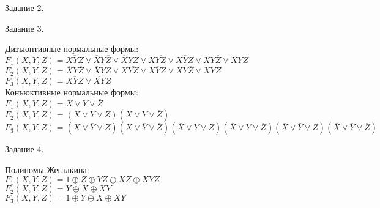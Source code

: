 \documentclass[a4paper,12pt]{report} %
\begin{document}
\bigskip

\newpage
\begin{center}
Задание  2.\\
\end{center}

\begin{flushleft}


\end{flushleft}

\bigskip


\begin{center}
Задание 3.
\end{center}

\begin{flushleft}
Дизъюнтивные нормальные формы:\\
$F_1(X,Y,Z)=\overline{XYZ} \vee \overline{X}Y\overline{Z} \vee \overline{X}YZ \vee X\overline{YZ} \vee X\overline{Y}Z \vee XY\overline{Z} \vee XYZ$\\
$F_2(X,Y,Z)=\overline{X}Y\overline{Z} \vee \overline{X}YZ \vee X\overline{YZ} \vee X\overline{Y}Z \vee XY\overline{Z} \vee XYZ$\\
$F_3(X,Y,Z)=\overline{XYZ} \vee \overline{XY}Z$\\
\bigskip
Конъюктивные нормальные формы:\\
$F_1(X,Y,Z)=X \vee Y \vee \overline{Z}$\\
$F_2(X,Y,Z)=(X\vee Y\vee Z)(X\vee Y\vee\overline{Z})$\\
$F_3(X,Y,Z)=(X\vee \overline{Y}\vee Z)(X \vee \overline{Y} \vee \overline{Z})(\overline{X} \vee Y \vee Z)(\overline{X} \vee Y \vee \overline{Z})(\overline{X} \vee \overline{Y} \vee Z)(\overline{X} \vee \overline{Y} \vee \overline{Z})$\\
\end{flushleft}

\bigskip


\begin{center}
Задание 4.\\
\end{center}

\begin{flushleft}
Полиномы Жегалкина:\\
$F_1(X,Y,Z)=1 \oplus Z \oplus YZ \oplus XZ \oplus XYZ$\\
$F_2(X,Y,Z)=Y \oplus X \oplus XY$\\
$F_3(X,Y,Z)=1 \oplus Y \oplus X \oplus XY$\\
\end{flushleft}
\end{document}
